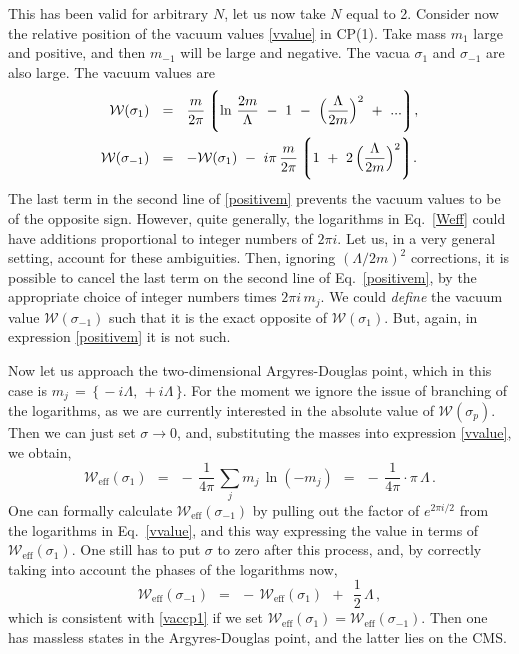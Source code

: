 \documentclass[12pt]{article}
\def\beq{\begin{equation}}
\def\eeq{\end{equation}}
\newcommand{\mc}[1]{\mathcal{#1}}
\begin{document}
	This has been valid for arbitrary $N$, let us now take $N$ equal to 2.
	Consider now the relative position of the vacuum values \eqref{vvalue} in CP(1). 
	Take mass $ m_1 $ large and positive, and then $ m_{-1} $ will be large and negative. 
	The vacua $ \sigma_1 $ and $ \sigma_{-1} $ are also large. 
	The vacuum values are
\begin{align}
%
\notag
	\mc{W}(\sigma_1) & ~~=~~ \frac{m}{2\pi}\,
			\Biggl\lgroup \ln\, \frac{2m}{\Lambda}  ~-~ 1 ~-~ \Big(\frac{\Lambda}{2m}\Big)^2 
			              ~+~ ... \Biggr\rgroup ,
	\\
%
\label{positivem}
	\mc{W}(\sigma_{-1}) & ~~=~~ - \mc{W}(\sigma_1) ~-~
			i\pi\, \frac{m}{2\pi}\, 
			\Biggl\lgroup 1 ~+~ 2\,\Big( \frac{\Lambda}{2m} \Big)^2 \Biggr\rgroup .
\end{align}
	The last term in the second line of \eqref{positivem} prevents the vacuum values to be of the
	opposite sign.
	However, quite generally, the logarithms in Eq.~\eqref{Weff} could have additions 
	proportional to integer numbers of $ 2\pi i $.
	Let us, in a very general setting, account for these ambiguities.
	Then, ignoring $(\Lambda/2m)^2$ corrections, it is possible 
	to cancel the last term on the second line of Eq.~\eqref{positivem}, by the appropriate choice of 
	integer numbers times $ 2\pi i\, m_j $.
	We could {\it define} the vacuum value $\mc{W}(\sigma_{-1})$ such that it is the exact opposite
	of $\mc{W}(\sigma_1)$.
	But, again, in expression \eqref{positivem} it is not such.

	
	Now let us approach the two-dimensional Argyres-Douglas point, which in this case is 
$ m_j \,=\, \{\, -i \Lambda,\, +i \Lambda \,\} $. 
	For the moment we ignore the issue of branching of the logarithms, as we are currently interested
	in the absolute value of $ \mc{W}(\sigma_p) $.
	Then we can just set $ \sigma \to 0 $, and, substituting the masses into expression \eqref{vvalue},
	we obtain,
\beq
\label{vaccp1}
	\mc{W}_\text{eff}(\sigma_1) ~~=~~ -\, \frac{1}{4\pi}\, \sum_j m_j\, \ln(-m_j)  ~~=~~ 
			-\, \frac{1}{4\pi}\cdot \pi\, \Lambda \,.
\eeq
	One can formally calculate $ \mc{W}_\text{eff}(\sigma_{-1}) $ by pulling out the factor of $ e^{2\pi i / 2} $ from
	the logarithms in Eq.~\eqref{vvalue}, and this way expressing the value in terms of $ \mc{W}_\text{eff}(\sigma_1) $.
	One still has to put $ \sigma $ to zero after this process, and, by correctly taking into account the phases of the
	logarithms now,
\beq
\label{relvalcp1}
	\mc{W}_\text{eff}(\sigma_{-1}) ~~=~~ -\, \mc{W}_\text{eff}(\sigma_1) ~~+~~ \frac{1}{2}\, \Lambda \,,
\eeq	
	which is consistent with \eqref{vaccp1} if we set $ \mc{W}_\text{eff}(\sigma_1) = \mc{W}_\text{eff}(\sigma_{-1}) $.
	Then one has massless states in the Argyres-Douglas point, and the latter lies on the CMS. 
\end{document}
